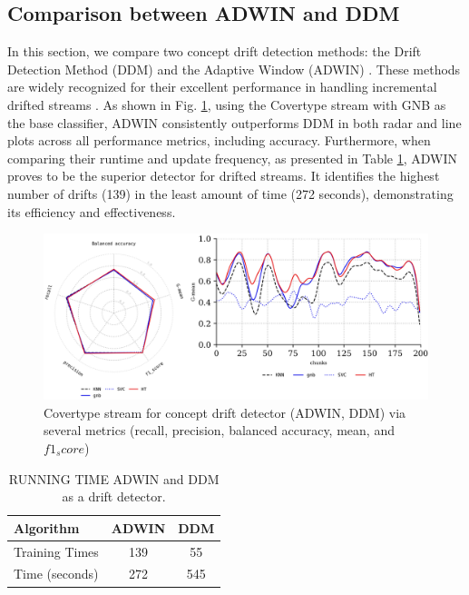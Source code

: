 \subsection{Comparison between ADWIN and DDM}
\label{sec:compared_drift_detector}
In this section, we compare two concept drift detection methods: the Drift Detection Method (DDM) \cite{gama2004learning} and the Adaptive Window (ADWIN) \cite{gama2004learning} \cite{adams2023explainable}. These methods are widely recognized for their excellent performance in handling incremental drifted streams \cite{gama2004learning}\cite{adams2023explainable}\cite{madkour2023historical}\cite{baena2006early}. As shown in Fig. \ref{fig:res5}, using the Covertype stream with GNB as the base classifier, ADWIN consistently outperforms DDM in both radar and line plots across all performance metrics, including accuracy. Furthermore, when comparing their runtime and update frequency, as presented in Table \ref{table:table_4}, ADWIN proves to be the superior detector for drifted streams. It identifies the highest number of drifts (139) in the least amount of time (272 seconds), demonstrating its efficiency and effectiveness.
\begin{figure}[!ht]
	\centering
	\includegraphics[width=1\linewidth]{5_Emerging/images/res4.png}
	\caption{Covertype stream for concept drift detector (ADWIN, DDM) via several metrics (recall, precision, balanced accuracy, mean, and $f1_score$)}
	\label{fig:res5}
\end{figure}
	
\begin{table}[!ht]
	\centering
	\begin{tabular}{|l|c|c|}
		\hline
	\textbf{Algorithm}     & \textbf{ADWIN} & \textbf{DDM}  \\ \hline
Training Times         & 139          & 55                   \\ \hline
Time (seconds)         & 272          & 545                   \\ \hline
	
	\end{tabular}

  \caption{RUNNING TIME ADWIN and DDM as a drift detector.}
	\label{table:table_4}
	\end{table}